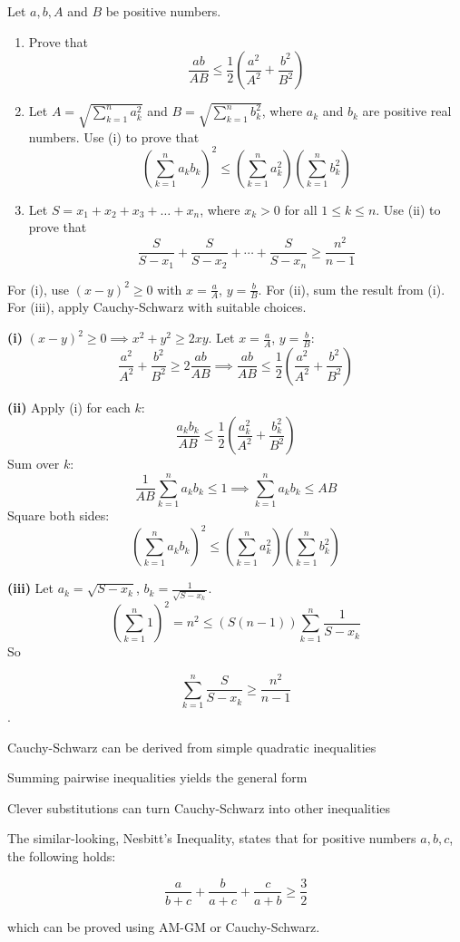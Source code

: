 \begin{problem}
Let $a, b, A$ and $B$ be positive numbers.
\begin{enumerate}[label=\textbf{(\roman*)}]
    \item Prove that
    \[ \frac{ab}{AB} \leq \frac{1}{2} \left( \frac{a^2}{A^2} + \frac{b^2}{B^2} \right) \]
    \item Let $A = \sqrt{\sum_{k=1}^n a_k^2}$ and $B = \sqrt{\sum_{k=1}^n b_k^2}$, where $a_k$ and $b_k$ are positive real numbers.
    Use (i) to prove that
    \[ \left( \sum_{k=1}^n a_k b_k \right)^2 \leq \left( \sum_{k=1}^n a_k^2 \right) \left( \sum_{k=1}^n b_k^2 \right) \]
    \item Let $S = x_1 + x_2 + x_3 + \dots + x_n$, where $x_k > 0$ for all $1 \leq k \leq n$. Use (ii) to prove that
    \[ \frac{S}{S-x_1} + \frac{S}{S-x_2} + \cdots + \frac{S}{S-x_n} \geq \frac{n^2}{n-1} \]
\end{enumerate}
\end{problem}

\begin{hint}
For (i), use $(x-y)^2 \geq 0$ with $x = \frac{a}{A}$, $y = \frac{b}{B}$. For (ii), sum the result from (i). For (iii), apply Cauchy-Schwarz with suitable choices.
\end{hint}

\begin{solution}
	\textbf{(i)} $(x-y)^2 \geq 0 \implies x^2 + y^2 \geq 2xy$. Let $x = \frac{a}{A}$, $y = \frac{b}{B}$:
\[ \frac{a^2}{A^2} + \frac{b^2}{B^2} \geq 2\frac{ab}{AB} \implies \frac{ab}{AB} \leq \frac{1}{2}\left(\frac{a^2}{A^2} + \frac{b^2}{B^2}\right) \]

	\textbf{(ii)} Apply (i) for each $k$:
\[ \frac{a_k b_k}{AB} \leq \frac{1}{2}\left(\frac{a_k^2}{A^2} + \frac{b_k^2}{B^2}\right) \]
Sum over $k$:
\[ \frac{1}{AB} \sum_{k=1}^n a_k b_k \leq 1 \implies \sum_{k=1}^n a_k b_k \leq AB \]
Square both sides:
\[ \left(\sum_{k=1}^n a_k b_k\right)^2 \leq \left(\sum_{k=1}^n a_k^2\right)\left(\sum_{k=1}^n b_k^2\right) \]

	\textbf{(iii)} Let $a_k = \sqrt{S-x_k}$, $b_k = \frac{1}{\sqrt{S-x_k}}$.
\[ \left(\sum_{k=1}^n 1\right)^2 = n^2 \leq (S(n-1)) \sum_{k=1}^n \frac{1}{S-x_k} \]
So 

$$\sum_{k=1}^n \frac{S}{S-x_k} \geq \frac{n^2}{n-1}$$.

\end{solution}

\begin{takeaways}
\item Cauchy-Schwarz can be derived from simple quadratic inequalities
\item Summing pairwise inequalities yields the general form
\item Clever substitutions can turn Cauchy-Schwarz into other inequalities
\item The similar-looking, Nesbitt's Inequality, states that for positive numbers $a, b, c$, the following holds: 

$$\frac{a}{b+c} + \frac{b}{a+c} + \frac{c}{a+b} \geq \frac{3}{2}$$

which can be proved using AM-GM or Cauchy-Schwarz.
\end{takeaways}
